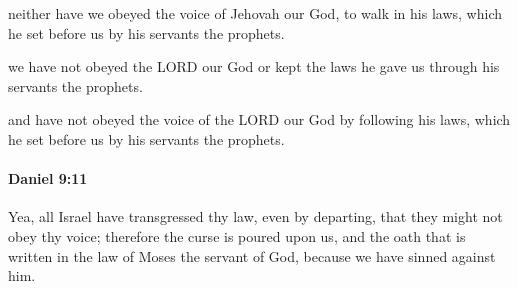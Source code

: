 			\begin{versebox}
					\item[BHS] 
					\item[LXX] 
					\item[ASV] neither have we obeyed the voice of Jehovah our God, to walk in his laws, which he set before us by his servants the prophets.
					\item[NIV] we have not obeyed the LORD our God or kept the laws he gave us through his servants the prophets.
					\item[NRSV] and have not obeyed the voice of the LORD our God by following his laws, which he set before us by his servants the prophets.
			\end{versebox}

		\paragraph{Daniel 9:11} %
			\label{DANIEL-9-11}

			Yea, all Israel have transgressed thy law, even by departing, that they might not obey thy voice; therefore the curse is poured upon us, and the oath that is written in the law of Moses the servant of God, because we have sinned against him.

